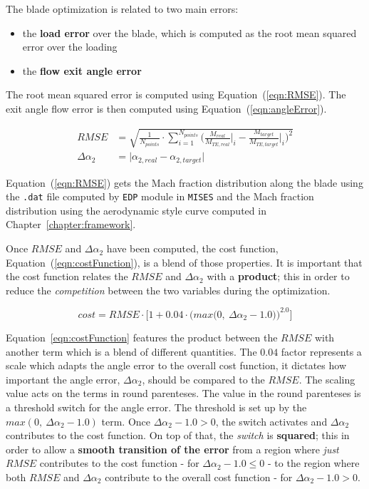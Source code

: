 The blade optimization is related to two main errors: 

\begin{itemize}
    \item the \textbf{load error} over the blade, which is computed as the root mean squared error over the loading 
    \item the \textbf{flow exit angle error}
\end{itemize}

The root mean squared error is computed using Equation~(\ref{eqn:RMSE}).
The exit angle flow error is then computed using Equation~(\ref{eqn:angleError}). 

\begin{align}
    RMSE            & = \sqrt{\frac{1}{N_{points}} \cdot \sum_{i = 1}^{N_{points}} \Bigg( \frac{M_{real}}{M_{TE, real}} \Bigg|_{i} - \frac{M_{target}}{M_{TE, target}} \Bigg|_{i} \Bigg)^2} 
    \label{eqn:RMSE} \\ 
    \Delta \alpha_2 & = \Big| \alpha_{2, real} - \alpha_{2, target} \Big| 
    \label{eqn:angleError} 
\end{align}

Equation~(\ref{eqn:RMSE}) gets the Mach fraction distribution along the blade using 
the \texttt{.dat} file computed by \texttt{EDP} module in \texttt{MISES} and the Mach 
fraction distribution using the aerodynamic style curve computed in Chapter~\ref{chapter:framework}.

Once $RMSE$ and $\Delta \alpha_2$ have been computed, the cost function, Equation~(\ref{eqn:costFunction}), is a blend of those properties.
It is important that the cost function relates the $RMSE$ and $\Delta \alpha_2$ with a \textbf{product}; this in order
to reduce the \textit{competition} between the two variables during the optimization.

\begin{equation}
    cost = RMSE \cdot \Big[ 1 + 0.04 \cdot \Big( max \Big( 0, \ \Delta \alpha_2 - 1.0 \Big) \Big)^{2.0} \Big]
    \label{eqn:costFunction}
\end{equation}

Equation~\ref{eqn:costFunction} features the product between the $RMSE$ with another term which is a blend of different quantities.
The $0.04$ factor represents a scale which adapts the angle error to the overall cost function, it dictates how important the angle error, 
$\Delta \alpha_2$, should be compared to the $RMSE$. The scaling value acts on the terms in round parenteses. 
The value in the round parenteses is a threshold switch for the angle error. The threshold is set up by the 
$max(0, \ \Delta \alpha_2 - 1.0 )$ term. Once $ \Delta \alpha_2 - 1.0 > 0$, the switch activates and $\Delta \alpha_2$ contributes to the cost function.
On top of that, the \textit{switch} is \textbf{squared}; this in order to allow a \textbf{smooth transition of the error} from a region where \textit{just}
$RMSE$ contributes to the cost function - for $ \Delta \alpha_2 - 1.0 \leq 0$ - to the region where both $RMSE$ and $\Delta \alpha_2$ contribute to the overall cost function
- for $ \Delta \alpha_2 - 1.0 > 0$.

